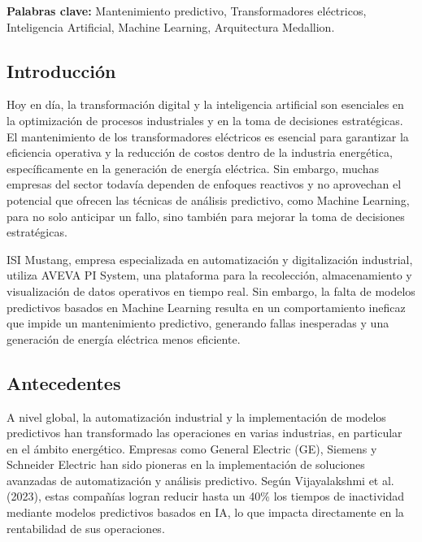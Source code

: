\documentclass{univalle-perfil}
\begin{document}
\textbf{Palabras clave:} Mantenimiento predictivo, Transformadores eléctricos,
Inteligencia Artificial, Machine Learning, Arquitectura Medallion.


\subsection{Introducción}

Hoy en día, la transformación digital y la inteligencia artificial son esenciales en la
optimización de procesos industriales y en la toma de decisiones estratégicas. El
mantenimiento de los transformadores eléctricos es esencial para garantizar la
eficiencia operativa y la reducción de costos dentro de la industria energética,
específicamente en la generación de energía eléctrica. Sin embargo, muchas
empresas del sector todavía dependen de enfoques reactivos y no aprovechan el
potencial que ofrecen las técnicas de análisis predictivo, como Machine Learning,
para no solo anticipar un fallo, sino también para mejorar la toma de decisiones
estratégicas.

ISI Mustang, empresa especializada en automatización y digitalización industrial,
utiliza AVEVA PI System, una plataforma para la recolección, almacenamiento y
visualización de datos operativos en tiempo real. Sin embargo, la falta de modelos
predictivos basados en Machine Learning resulta en un comportamiento ineficaz que
impide un mantenimiento predictivo, generando fallas inesperadas y una generación
de energía eléctrica menos eficiente.

\subsection{Antecedentes}

A nivel global, la automatización industrial y la implementación de modelos
predictivos han transformado las operaciones en varias industrias, en particular en el
ámbito energético. Empresas como General Electric (GE), Siemens y Schneider
Electric han sido pioneras en la implementación de soluciones avanzadas de
automatización y análisis predictivo. Según Vijayalakshmi et al. (2023), estas
compañías logran reducir hasta un 40\% los tiempos de inactividad mediante modelos
predictivos basados en IA, lo que impacta directamente en la rentabilidad de sus
operaciones.
\end{document}
